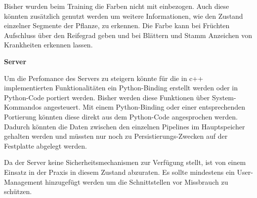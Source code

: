 \documentclass[12pt,titlepage, twoside]{article}
\begin{document}
Bisher wurden beim Training die Farben nicht mit einbezogen. Auch diese könnten zusätzlich genutzt werden um weitere Informationen, wie den Zustand einzelner Segmente der Pflanze, zu erkennen. 
Die Farbe kann bei Früchten Aufschluss über den Reifegrad geben und bei Blättern und Stamm Anzeichen von Krankheiten erkennen lassen.

\textbf{Server}

Um die Perfomance des Servers zu steigern könnte für die in c++ implementierten Funktionalitäten ein Python-Binding erstellt werden oder in Python-Code portiert werden. Bisher werden diese Funktionen über System-Kommandos angesteuert. 
Mit einem Python-Binding oder einer entsprechenden Portierung könnten diese direkt aus dem Python-Code angesprochen werden. 
Dadurch könnten die Daten zwischen den einzelnen Pipelines im Hauptspeicher gehalten werden und müssten nur noch zu Persistierungs-Zwecken auf der Festplatte abgelegt werden.

Da der Server keine Sicherheitsmechanismen zur Verfügung stellt, ist von einem Einsatz in der Praxis in diesem Zustand abzuraten. Es sollte mindestens ein User-Management hinzugefügt werden um die Schnittstellen vor Missbrauch zu schützen.


\newpage



\end{document}
